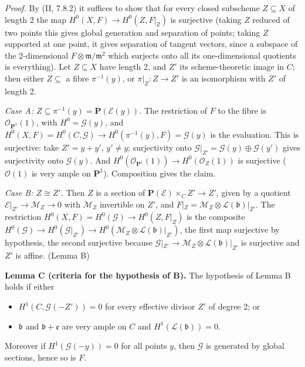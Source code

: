 \documentclass[11pt]{article}
\begin{document}
\emph{Proof.} By (II, 7.8.2) it suffices to show that for every closed subscheme $Z\subseteq X$ of length 2 the map $H^0(X,F)\to H^0(Z,F|_Z)$ is surjective (taking $Z$ reduced of two points this gives global generation and separation of points; taking $Z$ supported at one point, it gives separation of tangent vectors, since a subspace of the 2-dimensional $F\otimes\mathfrak m/\mathfrak m^2$ which surjects onto all its one-dimensional quotients is everything). Let $Z\subseteq X$ have length 2, and $Z'$ its scheme-theoretic image in $C$; then either $Z\subseteq$ a fibre $\pi^{-1}(y)$, or $\pi|_Z\colon Z\to Z'$ is an isomorphism with $Z'$ of length 2.

\emph{Case A: $Z\subseteq\pi^{-1}(y)=\mathbf P(\mathcal E(y))$.} The restriction of $F$ to the fibre is $\mathcal O_{\mathbf P^1}(1)$, with $H^0=\mathcal G(y)$, and $H^0(X,F)=H^0(C,\mathcal G)\to H^0(\pi^{-1}(y),F)=\mathcal G(y)$ is the evaluation. This is surjective: take $Z'=y+y'$, $y'\ne y$; surjectivity onto $\mathcal G|_{Z'}=\mathcal G(y)\oplus\mathcal G(y')$ gives surjectivity onto $\mathcal G(y)$. And $H^0(\mathcal O_{\mathbf P^1}(1))\to H^0(\mathcal O_Z(1))$ is surjective ($\mathcal O(1)$ is very ample on $\mathbf P^1$). Composition gives the claim.

\emph{Case B: $Z\cong Z'$.} Then $Z$ is a section of $\mathbf P(\mathcal E)\times_CZ'\to Z'$, given by a quotient $\mathcal E|_{Z'}\to\mathcal M_Z\to0$ with $\mathcal M_Z$ invertible on $Z'$, and $F|_Z=\mathcal M_Z\otimes\mathcal L(\mathfrak b)|_{Z'}$. The restriction $H^0(X,F)=H^0(\mathcal G)\to H^0(Z,F|_Z)$ is the composite $H^0(\mathcal G)\to H^0(\mathcal G|_{Z'})\to H^0(\mathcal M_Z\otimes\mathcal L(\mathfrak b)|_{Z'})$, the first map surjective by hypothesis, the second surjective because $\mathcal G|_{Z'}\to\mathcal M_Z\otimes\mathcal L(\mathfrak b)|_{Z'}$ is surjective and $Z'$ is affine. \hfill(Lemma B)

\textbf{Lemma C (criteria for the hypothesis of B).} The hypothesis of Lemma B holds if either
\begin{itemize}
\item[(i)] $H^1(C,\mathcal G(-Z'))=0$ for every effective divisor $Z'$ of degree 2; or
\item[(ii)] $\mathfrak b$ and $\mathfrak b+\mathfrak e$ are very ample on $C$ and $H^1(\mathcal L(\mathfrak b))=0$.
\end{itemize}
Moreover if $H^1(\mathcal G(-y))=0$ for all points $y$, then $\mathcal G$ is generated by global sections, hence so is $F$.
\end{document}
